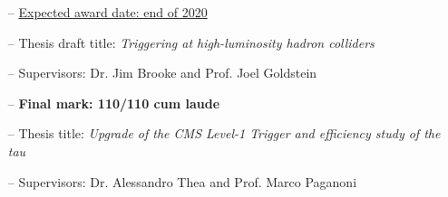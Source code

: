\documentclass[10pt,a4paper]{altacv}
\begin{document}

%

\begin{fullwidth}
\makecvheader
%
\end{fullwidth}





\begin{itemize}
    \setlength{\itemindent}{0.5em}
    \item[--]   \underline{Expected award date: end of 2020}
    \item[--]   Thesis draft title: \textit{Triggering at high-luminosity hadron colliders}
    \item[--]   Supervisors: Dr. Jim Brooke and Prof. Joel Goldstein
\end{itemize}

\medskip


\begin{itemize}
    \setlength{\itemindent}{0.5em}
    \item[--]   \textbf{Final mark: 110/110 cum laude}
    \item[--]   Thesis title: \textit{Upgrade of the CMS Level-1 Trigger and efficiency study of the tau}
    \item[--]   Supervisors: Dr. Alessandro Thea and Prof. Marco Paganoni
\end{itemize}

\medskip

\end{document}

